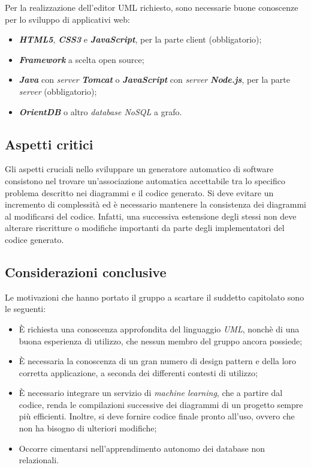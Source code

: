 Per la realizzazione dell'editor UML richiesto, sono necessarie buone conoscenze per lo sviluppo di applicativi web:
\begin{itemize}
	\item \textbf{\textit{HTML5}}, \textbf{\textit{CSS3}} e \textbf{\textit{JavaScript}}, per la parte client (obbligatorio);
	\item \textbf{\textit{Framework}} a scelta open source;
	\item \textbf{\textit{Java}} con \textit{server} \textbf{\textit{Tomcat}} o \textbf{\textit{JavaScript}} con \textit{server} \textbf{\textit{Node.js}}, per la parte \textit{server}	(obbligatorio);
	\item \textbf{\textit{OrientDB}} o altro \textit{database NoSQL} a grafo.
\end{itemize}

\subsection{Aspetti critici}

Gli aspetti cruciali nello sviluppare un generatore automatico di software consistono nel trovare un'associazione automatica accettabile tra lo specifico problema descritto nei diagrammi e il codice generato. Si deve evitare un incremento di complessità ed è necessario mantenere la consistenza dei diagrammi al modificarsi del codice. Infatti, una successiva estensione degli stessi non deve alterare riscritture o modifiche importanti da parte degli implementatori del codice generato.

\subsection{Considerazioni conclusive}

Le motivazioni che hanno portato il gruppo a scartare il suddetto capitolato sono le seguenti:
\begin{itemize}
	\item {\MakeUppercase{è}} richiesta una conoscenza approfondita del linguaggio \textit{UML}, nonchè di una buona esperienza di utilizzo, che nessun membro del gruppo ancora possiede;
	\item {\MakeUppercase{è}} necessaria la conoscenza di un gran numero di design pattern e della loro corretta applicazione, a seconda dei differenti contesti di utilizzo;
	\item {\MakeUppercase{è}} necessario integrare un servizio
	di \textit{machine learning}, che a partire dal codice, renda le compilazioni successive dei diagrammi di un progetto sempre più efficienti. Inoltre, si deve fornire codice finale pronto all'uso, ovvero che non ha bisogno di ulteriori modifiche;
	\item Occorre cimentarsi nell'apprendimento autonomo dei database non relazionali.
\end{itemize}